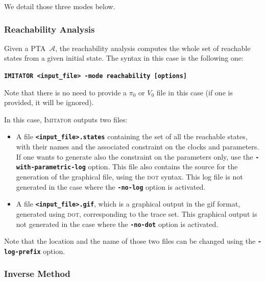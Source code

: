\documentclass[a4paper,10pt]{article}
\newcommand{\A}{\mathcal{A}}
\newcommand{\gdot}{\textsc{dot}}
\newcommand{\imitator}{\textsc{Imitator}}
\newcommand{\imitatorExec}{\code{IMITATOR}}
\newcommand{\code}[1]{\textbf{\texttt{#1}}}
\begin{document}
We detail those three modes below.



\subsubsection{Reachability Analysis} \label{ss:mode_reachability}

Given a PTA~$\A$, the reachability analysis computes the whole set of reachable states from a given initial state.
The syntax in this case is the following one:

\code{\imitatorExec{} <input\_file> -mode reachability [options]}

Note that there is no need to provide a $\pi_0$ or $V_0$ file in this case (if one is provided, it will be ignored).

In this case, \imitator{} outputs two files:

\begin{itemize}
	\item A file \code{<input\_file>.states} containing the set of all the reachable states, with their names and the associated constraint on the clocks and parameters.
	If one wants to generate also the constraint on the parameters only, use the \code{-with-parametric-log} option.
	This file also contains the source for the generation of the graphical file, using the \gdot{} syntax.
	This log file is not generated in the case where the \code{-no-log} option is activated.
	
	\item A file \code{<input\_file>.gif}, which is a graphical output in the gif format, generated using \gdot{}, corresponding to the trace set.
	This graphical output is not generated in the case where the \code{-no-dot} option is activated.
\end{itemize}

Note that the location and the name of those two files can be changed using the \code{-log-prefix} option.



\subsubsection{Inverse Method} \label{ss:mode_inversemethod}
\end{document}
